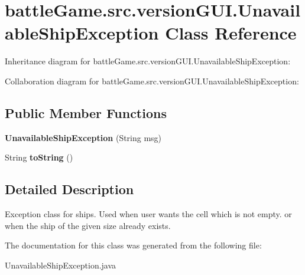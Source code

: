 \hypertarget{classbattleGame_1_1src_1_1versionGUI_1_1UnavailableShipException}{}\section{battle\+Game.\+src.\+version\+G\+U\+I.\+Unavailable\+Ship\+Exception Class Reference}
\label{classbattleGame_1_1src_1_1versionGUI_1_1UnavailableShipException}


Inheritance diagram for battle\+Game.\+src.\+version\+G\+U\+I.\+Unavailable\+Ship\+Exception\+:


Collaboration diagram for battle\+Game.\+src.\+version\+G\+U\+I.\+Unavailable\+Ship\+Exception\+:
\subsection*{Public Member Functions}
\begin{DoxyCompactItemize}
\item 
{\bfseries Unavailable\+Ship\+Exception} (String msg)\hypertarget{classbattleGame_1_1src_1_1versionGUI_1_1UnavailableShipException_a3e7cf6e487ecce3b6ff39afd6e4c26fd}{}\label{classbattleGame_1_1src_1_1versionGUI_1_1UnavailableShipException_a3e7cf6e487ecce3b6ff39afd6e4c26fd}

\item 
String {\bfseries to\+String} ()\hypertarget{classbattleGame_1_1src_1_1versionGUI_1_1UnavailableShipException_a081007a226e19027cd443674ab15ab32}{}\label{classbattleGame_1_1src_1_1versionGUI_1_1UnavailableShipException_a081007a226e19027cd443674ab15ab32}

\end{DoxyCompactItemize}


\subsection{Detailed Description}
Exception class for ships. Used when user wants the cell which is not empty. or when the ship of the given size already exists. 

The documentation for this class was generated from the following file\+:\begin{DoxyCompactItemize}
\item 
Unavailable\+Ship\+Exception.\+java\end{DoxyCompactItemize}
